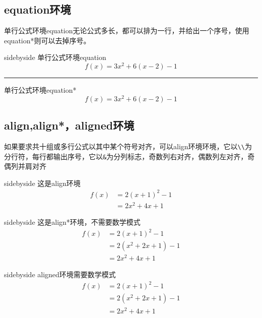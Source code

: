 \documentclass[cn,chinese,color=cyan]{elegantbook}
\begin{document}
\subsection{equation环境}
单行公式环境equation无论公式多长，都可以排为一行，并给出一个序号，使用equation*则可以去掉序号。
\begin{tcblisting}{sidebyside}
单行公式环境equation
\begin{equation}
f(x)=3x^2+6(x-2)-1
\end{equation}
\vskip 2mm \hrule \vskip 2mm
单行公式环境equation*
\begin{equation*}
f(x)=3x^2+6(x-2)-1
\end{equation*}
\end{tcblisting}

\subsection{align,align*，aligned环境}
如果要求共十组或多行公式以其中某个符号对齐，可以align环境环境，它以\verb|\\|为分行符，每行都输出序号，它以\verb|&|为分列标志，奇数列右对齐，偶数列左对齐，奇偶列并肩对齐
\begin{tcblisting}{sidebyside}
这是align环境
\begin{align} 
f(x) &=2(x+1)^{2}-1 \\
&=2 x^{2}+4 x+1 
\end{align}
\end{tcblisting}
\begin{tcblisting}{sidebyside}
这是align*环境，不需要数学模式
\begin{align*} 
f(x) &=2(x+1)^{2}-1 \\
&=2\left(x^{2}+2 x+1\right)-1 \\ 
&=2 x^{2}+4 x+1 
\end{align*}
\end{tcblisting}
\begin{tcblisting}{sidebyside}
aligned环境需要数学模式
$$\begin{aligned} 
f(x) &=2(x+1)^{2}-1 \\
&=2\left(x^{2}+2 x+1\right)-1 \\ 
&=2 x^{2}+4 x+1 
\end{aligned}$$
\end{tcblisting}
\end{document}

